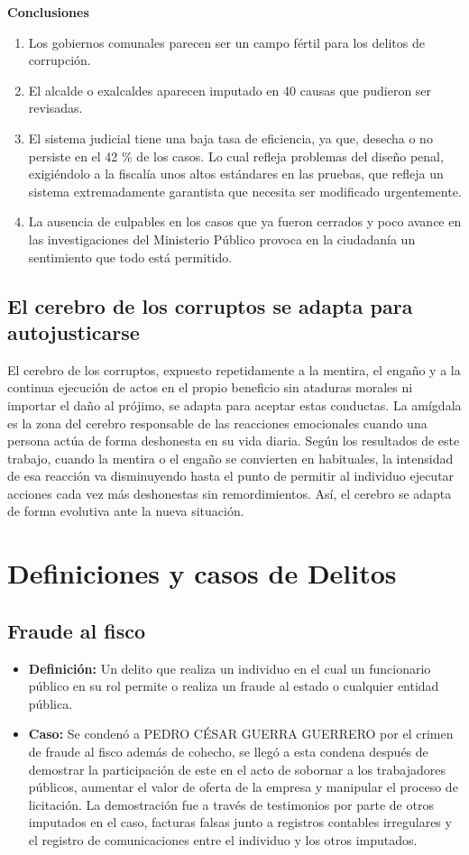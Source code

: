 \documentclass[letter,12pt]{article}
\begin{document}
		\textbf{Conclusiones}
		\begin{enumerate}
			\item Los gobiernos comunales parecen ser un campo fértil para los delitos de corrupción.
			\item El alcalde o exalcaldes aparecen imputado en 40 causas que pudieron ser revisadas.
			\item  El sistema judicial tiene una baja tasa de eficiencia, ya que,  desecha o no persiste en el 42 \% de los casos. Lo cual refleja problemas del diseño penal, exigiéndolo a la fiscalía unos altos estándares en las pruebas, que refleja un sistema extremadamente garantista que necesita ser modificado urgentemente.
			\item La ausencia de culpables en los casos que ya fueron cerrados y poco avance en las investigaciones del Ministerio Público provoca en la ciudadanía un sentimiento que todo está permitido. 
		\end{enumerate}
		
		\subsection{El cerebro de los corruptos se adapta para autojusticarse}\label{neurología}
			El cerebro de los corruptos, expuesto repetidamente a la mentira, el engaño y a la continua ejecución de actos en el propio beneficio sin ataduras morales ni importar el daño al prójimo, se adapta para aceptar estas conductas. La amígdala es la zona del cerebro responsable de las reacciones emocionales cuando una persona actúa de forma deshonesta en su vida diaria. Según los resultados de este trabajo, cuando la mentira o el engaño se convierten en habituales, la intensidad de esa reacción va disminuyendo hasta el punto de permitir al individuo ejecutar acciones cada vez más deshonestas sin remordimientos. Así, el cerebro se adapta de forma evolutiva ante la nueva situación.
			
			
		\section{Definiciones y casos de Delitos}
		\subsection*{Fraude al fisco}
			\begin{itemize}
				\item \textbf{Definición:} Un delito que realiza un individuo en el cual un funcionario público en su rol permite o realiza un fraude al estado o cualquier entidad pública.
				
				\item \textbf{Caso:} Se condenó a PEDRO CÉSAR GUERRA GUERRERO por el crimen de fraude al fisco además de cohecho, se llegó a esta condena después de demostrar la participación de este en el acto de sobornar a los trabajadores públicos, aumentar el valor de oferta de la empresa y manipular el proceso de licitación. La demostración fue a través de testimonios por parte de otros imputados en el caso, facturas falsas junto a registros contables irregulares y el registro de comunicaciones entre el individuo y los otros imputados.
			\end{itemize}
\end{document}
